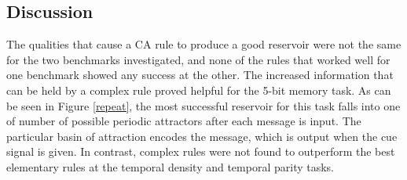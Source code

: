 \documentclass{elsarticle}
\begin{document}
\begin{multicols}{2}
	\section{Discussion}\label{discussion}
	The qualities that cause a CA rule to produce a good reservoir were not the 
	same for the two benchmarks investigated, and none of the rules that worked 
	well for one benchmark showed any success at the other. The increased 
	information that can be held by a complex rule proved helpful for the 5-bit 
	memory task. As can be seen in Figure \ref{repeat}, the most successful 
	reservoir for this task falls into one of number of possible  periodic 
	attractors after each message is input. The particular basin of attraction 
	encodes the message, which is output when the cue signal is given. In 
	contrast, complex rules were not found to outperform the best elementary 
	rules at the temporal density and temporal parity tasks.
	

\end{multicols}
\end{document}
